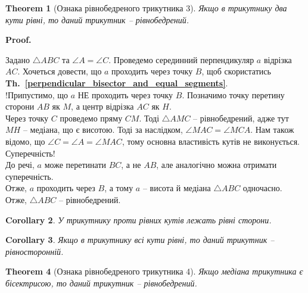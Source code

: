 \documentclass[a4paper, 10pt]{article}
\makeatletter
\theoremstyle{theoremdd}
\newtheorem{theorem}{Theorem}[subsection]
\theoremstyle{theoremdd}
\theoremstyle{theoremdd}
\theoremstyle{theoremdd}
\theoremstyle{theoremdd}
\theoremstyle{theoremdd}
\theoremstyle{theoremdd}
\theoremstyle{theoremdd}
\theoremstyle{theoremdd}
\newtheorem{corollary}[theorem]{Corollary}
\newcommand\thref[1]{\textbf{Th.~\ref{#1}}}
\renewenvironment{proof}[1][Proof.\\]{\par
\pushQED{\hfill \qed}%
\normalfont \topsep6\p@\@plus6\p@\relax
\trivlist
\item\relax
{\bfseries
#1\@addpunct{.}}\hspace\labelsep\ignorespaces
}{%
\popQED\endtrivlist\@endpefalse
}
\makeatother
\begin{document}
\begin{theorem}[Ознака рівнобедреного трикутника 3]
Якщо в трикутнику два кути рівні, то даний трикутник -- рівнобедрений.
\end{theorem}

\begin{proof}
Задано $\triangle ABC$ та $\angle A = \angle C$. Проведемо серединний перпендикуляр $a$ відрізка $AC$. Хочеться довести, що $a$ проходить через точку $B$, щоб скористатись \thref{perpendicular_bisector_and_equal_segments}.\\
!Припустимо, що $a$ НЕ проходить через точку $B$. Позначимо точку перетину сторони $AB$ як $M$, а центр відрізка $AC$ як $H$.\\
Через точку $C$ проведемо пряму $CM$. Тоді $\triangle AMC$ -- рівнобедрений, адже тут $MH$ -- медіана, що є висотою. Тоді за наслідком, $\angle MAC = \angle MCA$. Нам також відомо, що $\angle C = \angle A = \angle MAC$, тому основна властивість кутів не виконується. Суперечність!\\
До речі, $a$ може перетинати $BC$, а не $AB$, але аналогічно можна отримати суперечність.\\
Отже, $a$ проходить через $B$, а тому $a$ -- висота й медіана $\triangle ABC$ одночасно. Отже, $\triangle ABC$ -- рівнобедрений.
\end{proof}

\begin{corollary}
У трикутнику проти рівних кутів лежать рівні сторони.
\end{corollary}

\begin{corollary}
Якщо в трикутнику всі кути рівні, то даний трикутник -- рівносторонній.
\end{corollary}

\begin{theorem}[Ознака рівнобедреного трикутника 4]
Якщо медіана трикутника є бісектрисою, то даний трикутник -- рівнобедрений.
\end{theorem}
\end{document}
